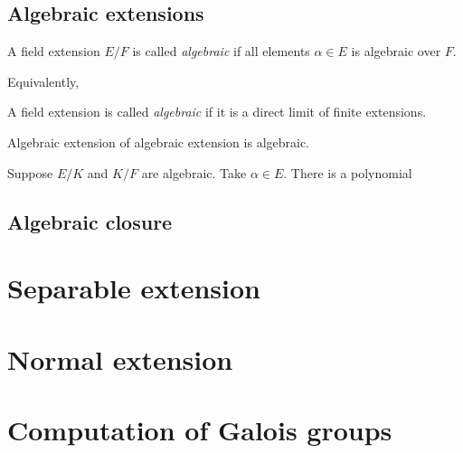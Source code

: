 \documentclass{../exp}
\begin{document}
\subsection{Algebraic extensions}
\begin{defn}
A field extension $E/F$ is called \emph{algebraic} if all elements $\alpha\in E$ is algebraic over $F$.
\end{defn}

Equivalently,
\begin{defn}
A field extension is called \emph{algebraic} if it is a direct limit of finite extensions.
\end{defn}

\begin{thm}
Algebraic extension of algebraic extension is algebraic.
\end{thm}
\begin{pf}
Suppose $E/K$ and $K/F$ are algebraic.
Take $\alpha\in E$.
There is a polynomial 
\end{pf}

\subsection{Algebraic closure}











\section{Separable extension}



\section{Normal extension}







\section{Computation of Galois groups}
\end{document}
